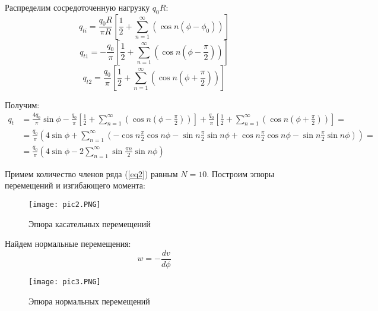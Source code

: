 Распределим сосредоточенную нагрузку $q_0R$:
\begin{equation}
    \label{eq9}
    q_{ti} = \frac{q_0R}{\pi R} \left[ \frac{1}{2} + \sum_{n = 1}^{\infty} \left( \cos n (\phi - \phi_0) \right) \right]
\end{equation}
\begin{equation}
    \label{eq10}
    q_{t1} = -\frac{q_0}{\pi} \left[ \frac{1}{2} + \sum_{n = 1}^{\infty} \left( \cos n (\phi - \frac{\pi}{2}) \right) \right]
\end{equation}
\begin{equation}
    \label{eq11}
    q_{t2} = \frac{q_0}{\pi} \left[ \frac{1}{2} + \sum_{n = 1}^{\infty} \left( \cos n (\phi + \frac{\pi}{2}) \right) \right]
\end{equation}

Получим:
\begin{equation}
    \label{eq12}
    \begin{split}
        q_t & = \frac{4q_0}{\pi} \sin \phi - \frac{q_0}{\pi} \left[ \frac{1}{2} + \sum_{n = 1}^{\infty} \left( \cos n (\phi - \frac{\pi}{2}) \right) \right] + \frac{q_0}{\pi} \left[ \frac{1}{2} + \sum_{n = 1}^{\infty} \left( \cos n (\phi + \frac{\pi}{2}) \right) \right] =
        \\
        & = \frac{q_0}{\pi} \left( 4 \sin \phi + \sum_{n = 1}^{\infty} \left( -\cos n \frac{\pi}{2} \cos n \phi - \sin n \frac{\pi}{2} \sin n \phi + \cos n \frac{\pi}{2} \cos n \phi - \sin n \frac{\pi}{2} \sin n \phi \right) \right) =
        \\
        & = \frac{q_0}{\pi} \left( 4 \sin \phi - 2\sum_{n = 1}^{\infty} \sin\frac{\pi n}{2} \sin n \phi \right)
    \end{split}
\end{equation}

Примем количество членов ряда (\ref{eq2}) равным $N = 10$. Построим эпюры перемещений и изгибающего момента:
\begin{figure}[H]
    \begin{center}
        \texttt{[image: pic2.PNG]}
        \caption{Эпюра касательных перемещений}
        \label{pic2}
    \end{center}
\end{figure}

Найдем нормальные перемещения:
\begin{equation}
    \label{eq13}
    w = - \frac{dv}{d\phi}
\end{equation}

\begin{figure}[H]
    \begin{center}
        \texttt{[image: pic3.PNG]}
        \caption{Эпюра нормальных перемещений}
        \label{pic3}
    \end{center}    
\end{figure}

